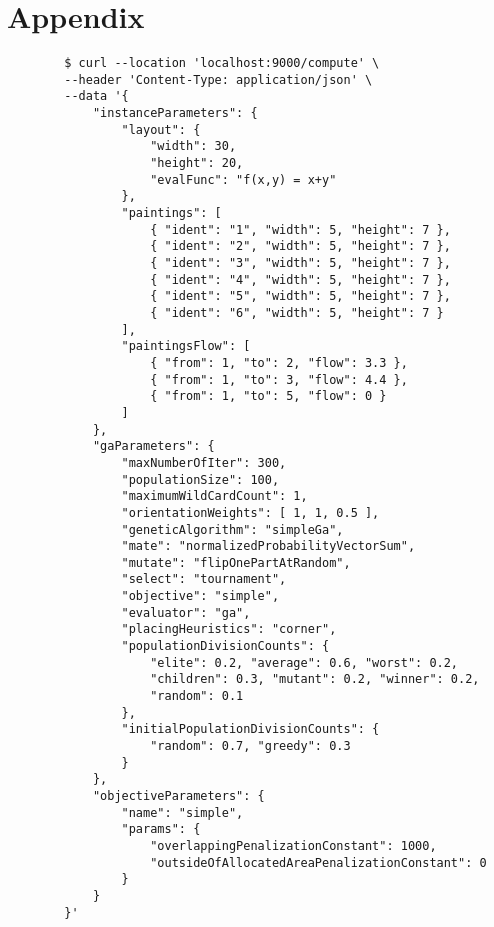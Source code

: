 \chapter{Appendix}\label{ch:appendix}


\begin{listing}[h!]
    \centering
    \begin{verbatim}
        $ curl --location 'localhost:9000/compute' \
        --header 'Content-Type: application/json' \
        --data '{
            "instanceParameters": {
                "layout": {
                    "width": 30,
                    "height": 20,
                    "evalFunc": "f(x,y) = x+y"
                },
                "paintings": [
                    { "ident": "1", "width": 5, "height": 7 },
                    { "ident": "2", "width": 5, "height": 7 },
                    { "ident": "3", "width": 5, "height": 7 },
                    { "ident": "4", "width": 5, "height": 7 },
                    { "ident": "5", "width": 5, "height": 7 },
                    { "ident": "6", "width": 5, "height": 7 }
                ],
                "paintingsFlow": [
                    { "from": 1, "to": 2, "flow": 3.3 },
                    { "from": 1, "to": 3, "flow": 4.4 },
                    { "from": 1, "to": 5, "flow": 0 }
                ]
            },
            "gaParameters": {
                "maxNumberOfIter": 300,
                "populationSize": 100,
                "maximumWildCardCount": 1,
                "orientationWeights": [ 1, 1, 0.5 ],
                "geneticAlgorithm": "simpleGa",
                "mate": "normalizedProbabilityVectorSum",
                "mutate": "flipOnePartAtRandom",
                "select": "tournament",
                "objective": "simple",
                "evaluator": "ga",
                "placingHeuristics": "corner",
                "populationDivisionCounts": {
                    "elite": 0.2, "average": 0.6, "worst": 0.2,
                    "children": 0.3, "mutant": 0.2, "winner": 0.2,
                    "random": 0.1
                },
                "initialPopulationDivisionCounts": {
                    "random": 0.7, "greedy": 0.3
                }
            },
            "objectiveParameters": {
                "name": "simple",
                "params": {
                    "overlappingPenalizationConstant": 1000,
                    "outsideOfAllocatedAreaPenalizationConstant": 0
                }
            }
        }'
    \end{verbatim}
    \cprotect\caption[Example of computation submission without instance name]
    {Example of computation submission using \verb|curl|\footnote{\url{https://curl.se/}} without specifying the instance name.
    Without it, everything has to be entered manually into the request – layout width and height, paintings together with their flow, and evaluation function.
    }

    \label{lst:computation-submission-manual}
\end{listing}

